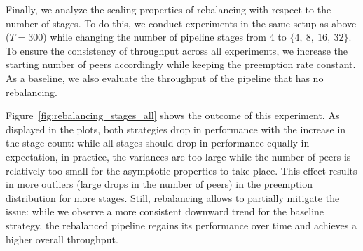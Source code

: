 Finally, we analyze the scaling properties of rebalancing with respect to the number of stages. To do this, we conduct experiments in the same setup as above ($T=300$) while changing the number of pipeline stages from 4 to $\{4,\ 8,\ 16,\ 32\}$. To ensure the consistency of throughput across all experiments, we increase the starting number of peers accordingly while keeping the preemption rate constant. As a baseline, we also evaluate the throughput of the pipeline that has no rebalancing.

Figure~\ref{fig:rebalancing_stages_all} shows the outcome of this experiment. As displayed in the plots, both strategies drop in performance with the increase in the stage count: while all stages should drop in performance equally in expectation, in practice, the variances are too large while the number of peers is relatively too small for the asymptotic properties to take place. This effect results in more outliers (large drops in the number of peers) in the preemption distribution for more stages. Still, rebalancing allows to partially mitigate the issue: while we observe a more consistent downward trend for the baseline strategy, the rebalanced pipeline regains its performance over time and achieves a higher overall throughput.

